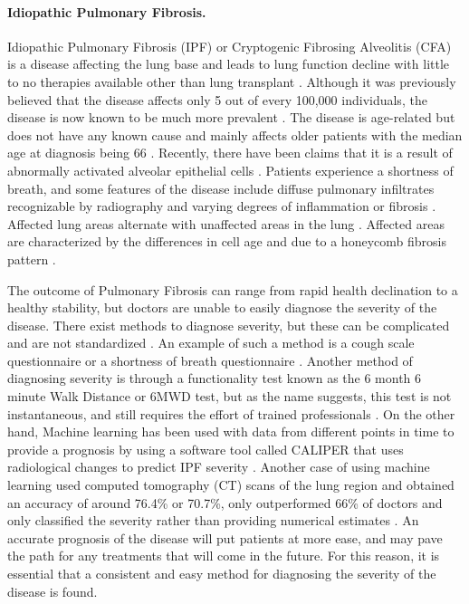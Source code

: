 \documentclass[12pt]{article}
\begin{document}
\paragraph*{Idiopathic Pulmonary Fibrosis.}

Idiopathic Pulmonary Fibrosis (IPF) or Cryptogenic Fibrosing Alveolitis (CFA) is a disease affecting the lung base and leads to lung function decline with little to no therapies available other than lung transplant \cite{mason1999pharmacological,gross2001idiopathic}. 
Although it was previously believed that the disease affects only 5 out of every 100,000 individuals, the disease is now known to be much more prevalent \cite{coultas1994epidemiology,mason1999pharmacological,raghu2018diagnosis}. 
The disease is age-related but does not have any known cause and mainly affects older patients with the median age at diagnosis being 66 \cite{king2011idiopathic,raghu2018diagnosis}. %
Recently, there have been claims that it is a result of abnormally activated alveolar epithelial cells \cite{king2011idiopathic}. %
Patients experience a shortness of breath, and some features of the disease include diffuse pulmonary infiltrates recognizable by radiography and varying degrees of inflammation or fibrosis \cite{gross2001idiopathic}. 
Affected lung areas alternate with unaffected areas in the lung \cite{gross2001idiopathic}.
Affected areas are characterized by the differences in cell age and due to a honeycomb fibrosis pattern \cite{gross2001idiopathic}.

The outcome of Pulmonary Fibrosis can range from rapid health declination to a healthy stability, but doctors are unable to easily diagnose the severity of the disease. 
There exist methods to diagnose severity, but these can be complicated and are not standardized \cite{robbie2017evaluating}. 
An example of such a method is a cough scale questionnaire or a shortness of breath questionnaire \cite{robbie2017evaluating,king2014phase,van2016cough}.
Another method of diagnosing severity is through a functionality test known as the 6 month 6 minute Walk Distance or 6MWD test, but as the name suggests, this test is not instantaneous, and still requires the effort of trained professionals \cite{robbie2017evaluating,du20146}.
On the other hand, Machine learning has been used with data from different points in time to provide a prognosis by using a software tool called CALIPER that uses radiological changes to predict IPF severity \cite{maldonado2014automated}.
Another case of using machine learning used computed tomography (CT) scans of the lung region and obtained an accuracy of around 76.4\% or 70.7\%, only outperformed 66\% of doctors and only classified the severity rather than providing numerical estimates \cite{walsh2018deep}.
An accurate prognosis of the disease will put patients at more ease, and may pave the path for any treatments that will come in the future. 
For this reason, it is essential that a consistent and easy method for diagnosing the severity of the disease is found.
\end{document}
